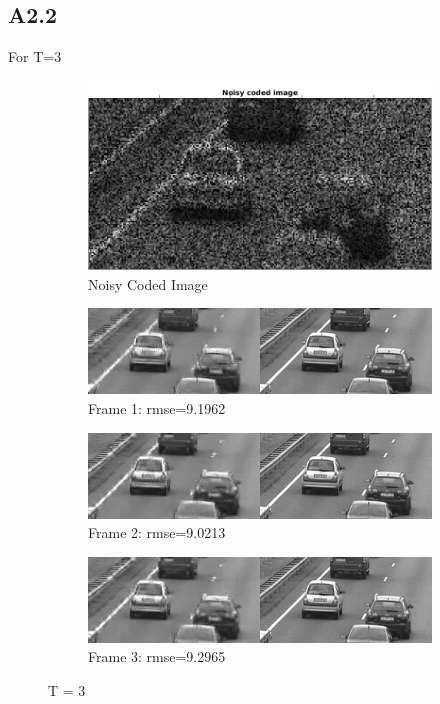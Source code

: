 \documentclass{article}
\begin{document}
\subsection*{A2.2}
For T=3
\begin{figure}[H]
  \centering

  \begin{subfigure}[t]{1.0\linewidth}
    \centering
    \includegraphics[scale=0.25]{images/noisy_coded_img}
    \caption{Noisy Coded Image}
  \end{subfigure}
  
  
  \begin{subfigure}[t]{1.0\linewidth}
    \centering
    \includegraphics[scale=0.5]{images/frame_1}
    \caption{Frame 1: rmse=9.1962}
  \end{subfigure}
  
  \begin{subfigure}[t]{1.0\linewidth}
    \centering
    \includegraphics[scale=0.5]{images/frame_2}
    \caption{Frame 2: rmse=9.0213}
  \end{subfigure}
  
  \begin{subfigure}[t]{1.0\linewidth}
    \centering
    \includegraphics[scale=0.5]{images/frame_2}
    \caption{Frame 3: rmse=9.2965}
  \end{subfigure}
  
  \caption{T = 3}
  \label{fig:1}
\end{figure}
\end{document}
